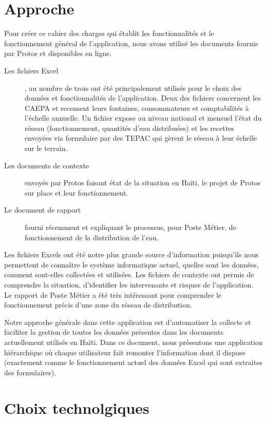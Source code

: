 \documentclass[a4paper, 11pt]{article}
\begin{document}
\section{Approche}
  Pour créer ce cahier des charges qui établit les fonctionnalités et le fonctionnement général de l'application, nous avons utilisé les documents fournis par Protos et disponibles en ligne.
  \begin{description}
    \item[Les fichiers Excel], au nombre de trois ont été principalement utilisés pour le choix des données et fonctionnalités de l'application. Deux des fichiers concernent les CAEPA et recensent leurs fontaines, consommateurs et comptabilités à l'échelle annuelle. Un fichier expose au niveau national et mensuel l'état du réseau (fonctionnement, quantités d'eau distribuées) et les recettes envoyées via formulaire par des TEPAC qui gèrent le réseau à leur échelle sur le terrain.
    \item[Les documents de contexte] envoyés par Protos faisant état de la situation en Haïti, le projet de Protos sur place et leur fonctionnement.
    \item[Le document de rapport] fourni récemment et expliquant le processus, pour Poste Métier, de fonctionnement de la distribution de l'eau.
  \end{description}
  Les fichiers Excels ont été notre plus grande source d'information puisqu'ils nous permettent de connaître le système informatique actuel, quelles sont les données, comment sont-elles collectées et utilisées.
  Les fichiers de contexte ont permis de comprendre la situation, d'identifier les intervenants et risques de l'application.
  Le rapport de Poste Métier a été très intéressant pour comprendre le fonctionnement précis d'une zone du réseau de distribution.

  Notre approche générale dans cette application est d'automatiser la collecte et faciliter la gestion de toutes les données présentes dans les documents actuellement utilisés en Haïti. Dans ce document, nous présentons une application hiérarchique où chaque utilisateur fait remonter l'information dont il dispose (exactement comme le fonctionnement actuel des données Excel qui sont extraites des formulaires).


\section{Choix technolgiques}
\end{document}
